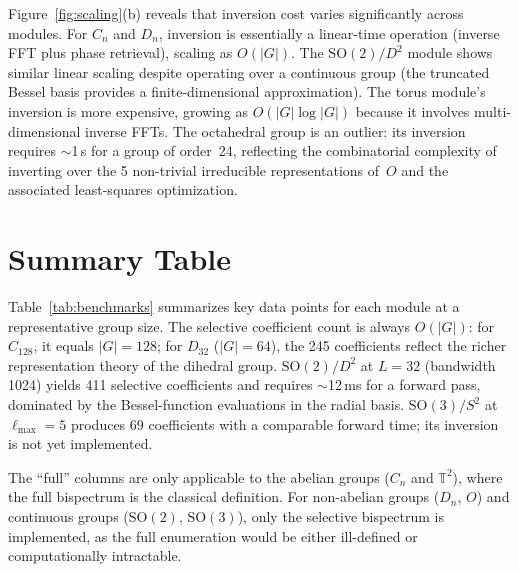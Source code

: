 \documentclass[11pt]{article}
\begin{document}
Figure~\ref{fig:scaling}(b) reveals that inversion cost varies significantly
across modules.
For $C_n$ and $D_n$, inversion is essentially a linear-time operation (inverse
FFT plus phase retrieval), scaling as $O(|G|)$.
The $\mathrm{SO}(2)/D^2$ module shows similar linear scaling despite operating
over a continuous group (the truncated Bessel basis provides a
finite-dimensional approximation).
The torus module's inversion is more expensive, growing as $O(|G| \log |G|)$
because it involves multi-dimensional inverse FFTs.
The octahedral group is an outlier: its inversion requires $\sim$1\,s for a
group of order~24, reflecting the combinatorial complexity of inverting over
the 5 non-trivial irreducible representations of~$O$ and the associated
least-squares optimization.

\section{Summary Table}



Table~\ref{tab:benchmarks} summarizes key data points for each module at a
representative group size.
The selective coefficient count is always $O(|G|)$: for $C_{128}$, it equals
$|G| = 128$; for $D_{32}$ ($|G| = 64$), the 245 coefficients reflect the
richer representation theory of the dihedral group.
$\mathrm{SO}(2)/D^2$ at $L = 32$ (bandwidth 1024) yields 411 selective
coefficients and requires $\sim$12\,ms for a forward pass, dominated by the
Bessel-function evaluations in the radial basis.
$\mathrm{SO}(3)/S^2$ at $\ell_{\max} = 5$ produces 69 coefficients with a
comparable forward time; its inversion is not yet implemented.

The ``full'' columns are only applicable to the abelian groups ($C_n$ and
$\mathbb{T}^2$), where the full bispectrum is the classical definition.
For non-abelian groups ($D_n$, $O$) and continuous groups ($\mathrm{SO}(2)$,
$\mathrm{SO}(3)$), only the selective bispectrum is implemented, as the full
enumeration would be either ill-defined or computationally intractable.
\end{document}
